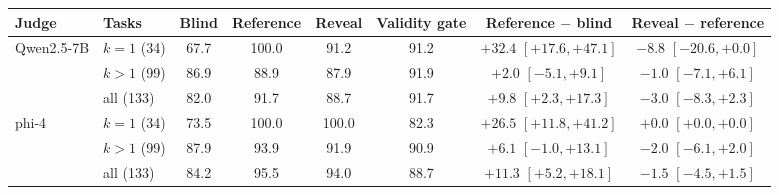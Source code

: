 \begin{tabular}{llcccccc}
\toprule
Judge & Tasks & Blind & Reference & Reveal & Validity gate & Reference $-$ blind & Reveal $-$ reference \\
\midrule
Qwen2.5-7B & $k{=}1$ (34) & 67.7 & 100.0 & 91.2 & 91.2 & $+32.4$ {\scriptsize$[+17.6,+47.1]$} & $-8.8$ {\scriptsize$[-20.6,+0.0]$} \\
 & $k{>}1$ (99) & 86.9 & 88.9 & 87.9 & 91.9 & $+2.0$ {\scriptsize$[-5.1,+9.1]$} & $-1.0$ {\scriptsize$[-7.1,+6.1]$} \\
 & all (133) & 82.0 & 91.7 & 88.7 & 91.7 & $+9.8$ {\scriptsize$[+2.3,+17.3]$} & $-3.0$ {\scriptsize$[-8.3,+2.3]$} \\
\addlinespace
phi-4 & $k{=}1$ (34) & 73.5 & 100.0 & 100.0 & 82.3 & $+26.5$ {\scriptsize$[+11.8,+41.2]$} & $+0.0$ {\scriptsize$[+0.0,+0.0]$} \\
 & $k{>}1$ (99) & 87.9 & 93.9 & 91.9 & 90.9 & $+6.1$ {\scriptsize$[-1.0,+13.1]$} & $-2.0$ {\scriptsize$[-6.1,+2.0]$} \\
 & all (133) & 84.2 & 95.5 & 94.0 & 88.7 & $+11.3$ {\scriptsize$[+5.2,+18.1]$} & $-1.5$ {\scriptsize$[-4.5,+1.5]$} \\
\bottomrule
\end{tabular}
